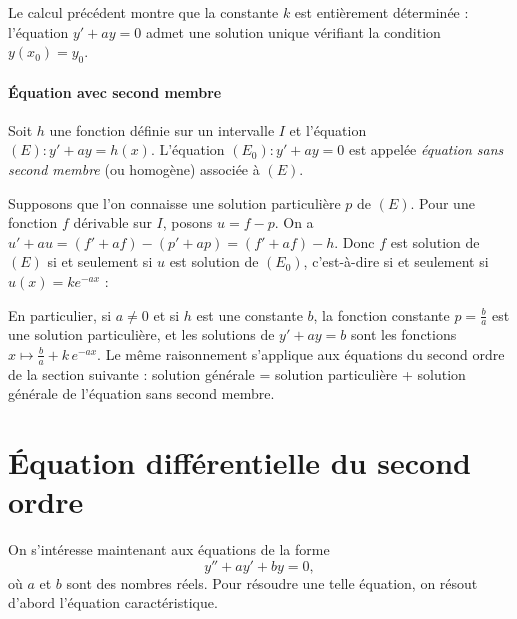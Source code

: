                   Le calcul pr\'ec\'edent montre que la constante $k$ est enti\`erement d\'etermin\'ee :
                  l'\'equation $y' + a y = 0$ admet une
                  solution unique v\'erifiant la condition $y(x_0) = y_0$.
            \paragraph{\'Equation avec second membre}
                  Soit $h$ une fonction d\'efinie sur un intervalle $I$ et l'\'equation
                  $(E) : y' + a y = h(x)$. L'\'equation $(E_0) : y' + a y = 0$ est appel\'ee
                  \emph{\'equation sans second membre} (ou homog\`ene) associ\'ee \`a $(E)$.

                  Supposons que l'on connaisse une solution particuli\`ere $p$ de $(E)$.
                  Pour une fonction $f$ d\'erivable sur $I$, posons $u = f - p$. On a
                  $u' + a u = (f' + a f) - (p' + a p) = (f' + a f) - h$.
                  Donc $f$ est solution de $(E)$ si et seulement si $u$ est solution de $(E_0)$,
                  c'est-\`a-dire si et seulement si $u(x) = k e^{-ax}$ :
                  \par\smallskip\noindent
                  \par\smallskip
                  En particulier, si $a \neq 0$ et si $h$ est une constante $b$, la fonction constante $p = \frac{b}{a}$
                  est une solution particuli\`ere, et les solutions de $y' + a y = b$ sont les fonctions
                  $x \mapsto \frac{b}{a} + k\,e^{-ax}$.
                  Le m\^eme raisonnement s'applique aux \'equations du second ordre de la section suivante :
                  solution g\'en\'erale = solution particuli\`ere + solution g\'en\'erale de l'\'equation sans second membre.
%
      \section{\'Equation diff\'erentielle du second ordre}
%
%
            On s'int\'eresse maintenant aux \'equations de la forme
            \begin{equation}
            \label{eq: diff second ordre}
                  y'' + a y' + by = 0,
            \end{equation}
            o\`u $a$ et $b$ sont des nombres r\'eels.
            Pour r\'esoudre une telle \'equation, on r\'esout d'abord l'\'equation caract\'eristique.
